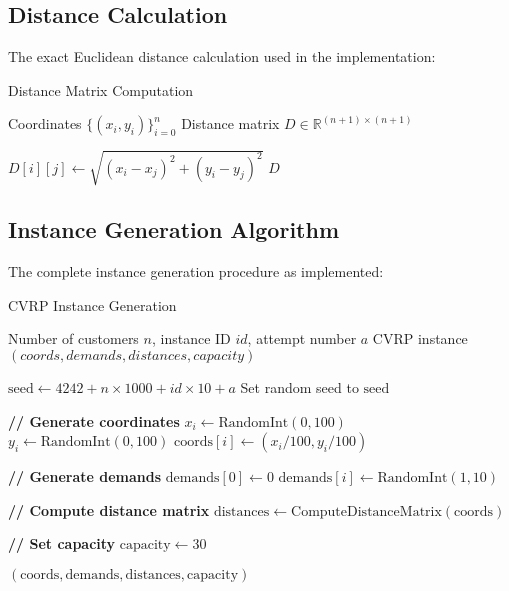 \documentclass[11pt]{article}
\begin{document}
\subsection{Distance Calculation}

The exact Euclidean distance calculation used in the implementation:

\begin{algorithm}
\caption{Distance Matrix Computation}
\begin{algorithmic}[1]
\REQUIRE Coordinates $\{(x_i, y_i)\}_{i=0}^n$
\ENSURE Distance matrix $D \in \mathbb{R}^{(n+1) \times (n+1)}$

        \STATE $D[i][j] \leftarrow \sqrt{(x_i - x_j)^2 + (y_i - y_j)^2}$
    \ENDFOR
\ENDFOR
\RETURN $D$
\end{algorithmic}
\end{algorithm}

\subsection{Instance Generation Algorithm}

The complete instance generation procedure as implemented:

\begin{algorithm}
\caption{CVRP Instance Generation}
\begin{algorithmic}[1]
\REQUIRE Number of customers $n$, instance ID $id$, attempt number $a$
\ENSURE CVRP instance $(coords, demands, distances, capacity)$

\STATE $\text{seed} \leftarrow 4242 + n \times 1000 + id \times 10 + a$
\STATE Set random seed to $\text{seed}$

\STATE \textbf{// Generate coordinates}
    \STATE $x_i \leftarrow \text{RandomInt}(0, 100)$
    \STATE $y_i \leftarrow \text{RandomInt}(0, 100)$
    \STATE $\text{coords}[i] \leftarrow (x_i/100, y_i/100)$
\ENDFOR

\STATE \textbf{// Generate demands}
\STATE $\text{demands}[0] \leftarrow 0$ 
    \STATE $\text{demands}[i] \leftarrow \text{RandomInt}(1, 10)$
\ENDFOR

\STATE \textbf{// Compute distance matrix}
\STATE $\text{distances} \leftarrow \text{ComputeDistanceMatrix}(\text{coords})$

\STATE \textbf{// Set capacity}
\STATE $\text{capacity} \leftarrow 30$

\RETURN $(\text{coords}, \text{demands}, \text{distances}, \text{capacity})$
\end{algorithmic}
\end{algorithm}
\end{document}
